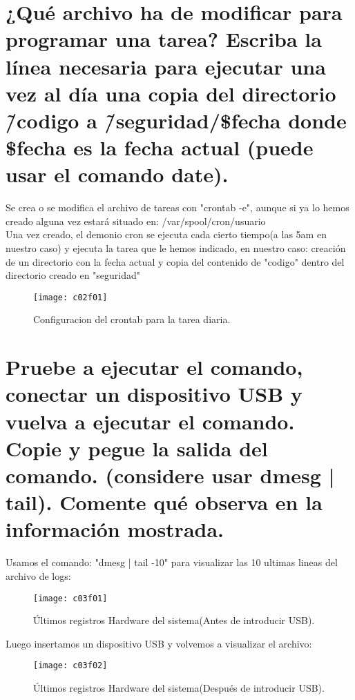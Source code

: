 \section{¿Qué archivo ha de modificar para programar una tarea? Escriba la línea necesaria para ejecutar una vez al día una copia del directorio \~/codigo a \~/seguridad/\$fecha donde \$fecha es la fecha actual	(puede usar el comando date). \cite{c02}}

Se crea o se modifica el archivo de tareas con "crontab -e", aunque si ya lo hemos creado alguna vez estará situado en: /var/spool/cron/usuario\\

Una vez creado, el demonio cron se ejecuta cada cierto tiempo(a las 5am en nuestro caso) y ejecuta la tarea que le hemos indicado, en nuestro caso: creación de un directorio con la fecha actual y copia del contenido de "codigo" dentro del directorio creado en "seguridad"

\begin{figure}[H]
	\centering
	\texttt{[image: c02f01]}
	\caption{Configuracion del crontab para la tarea diaria.}
	\label{fig:c02f01}
\end{figure}



\section{Pruebe a ejecutar el comando, conectar un dispositivo USB y vuelva a ejecutar el comando. Copie y pegue la salida del comando. (considere usar dmesg | tail). Comente qué observa en la información mostrada.}

Usamos el comando: "dmesg | tail -10" para visualizar las 10 ultimas lineas del archivo de logs:

\begin{figure}[H]
	\centering
	\texttt{[image: c03f01]}
	\caption{Últimos registros Hardware del sistema(Antes de introducir USB).}
	\label{fig:c03f01}
\end{figure}

Luego insertamos un dispositivo USB y volvemos a visualizar el archivo:

\begin{figure}[H]
	\centering
	\texttt{[image: c03f02]}
	\caption{Últimos registros Hardware del sistema(Después de introducir USB).}
	\label{fig:c03f02}
\end{figure}

